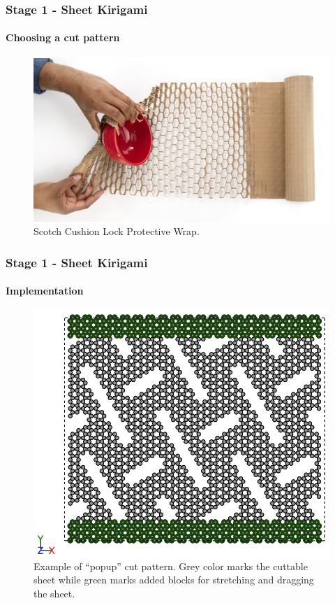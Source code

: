 \documentclass[
	10pt, %
]{beamer}
\begin{document}
\begin{frame}
	\frametitle{Stage 1 - Sheet Kirigami}
	\framesubtitle{Choosing a cut pattern}

	\begin{figure}
		\includegraphics[height=0.6\textheight]{figures/Scotch_Cushion_Lock_1.jpg}
		\caption{Scotch Cushion Lock Protective Wrap.}
	\end{figure}	
	
\end{frame}



\begin{frame}
	\frametitle{Stage 1 - Sheet Kirigami}
	\framesubtitle{Implementation}


	\begin{figure}
		\includegraphics[height=0.6\textheight]{figures/cutpattern.png}
		\caption{Example of ``popup'' cut pattern. Grey color marks the cuttable sheet while green marks added blocks for stretching and dragging the sheet.}
	\end{figure}	

\end{frame}
\end{document}
